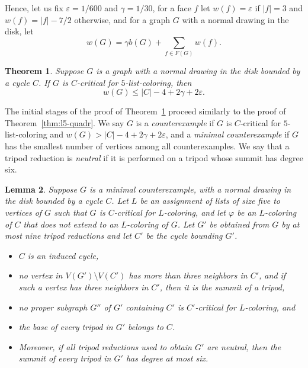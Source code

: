 \documentclass[12pt,twoside,openright,a4paper]{book}
\newtheorem{theorem}{Theorem}[chapter]
\newtheorem{lemma}[theorem]{Lemma}
\begin{document}
Hence, let us fix $\varepsilon=1/600$ and $\gamma=1/30$, for a face $f$ let $w(f)=\varepsilon$ if $|f|=3$ and $w(f)=|f|-7/2$ otherwise,
and for a graph $G$ with a normal drawing in the disk, let
$$w(G)=\gamma b(G)+\sum_{f\in F(G)} w(f).$$
\begin{theorem}\label{thm:l5-lin}
Suppose $G$ is a graph with a normal drawing in the disk bounded by a cycle $C$.
If $G$ is $C$-critical for $5$-list-coloring, then
$$w(G)\le |C|-4+2\gamma+2\varepsilon.$$
\end{theorem}
The initial stages of the proof of Theorem~\ref{thm:l5-lin} proceed similarly to the proof
of Theorem~\ref{thm:l5-quadr}.  We say $G$ is a \emph{counterexample} if $G$ is $C$-critical for $5$-list-coloring
and $w(G)>|C|-4+2\gamma+2\varepsilon$, and a \emph{minimal counterexample} if $G$ has the smallest number of vertices
among all counterexamples.  
We say that a tripod reduction is \emph{neutral} if it is performed on a tripod whose summit
has degree six.
\begin{lemma}\label{lemma:l5-lin-basic}
Suppose $G$ is a minimal counterexample, with a normal drawing in the disk bounded by a cycle $C$.
Let $L$ be an assignment of lists of size five to vertices of $G$ such that $G$ is $C$-critical for $L$-coloring,
and let $\varphi$ be an $L$-coloring of $C$ that does not extend to an $L$-coloring of $G$.
Let $G'$ be obtained from $G$ by at most nine tripod reductions and let $C'$ be the cycle bounding $G'$.
\begin{itemize}
\item $C$ is an induced cycle,
\item no vertex in $V(G')\setminus V(C')$ has more than three neighbors in $C'$, and if such a vertex
has three neighbors in $C'$, then it is the summit of a tripod, 
\item no proper subgraph $G''$ of $G'$ containing $C'$ is $C'$-critical for $L$-coloring, and
\item the base of every tripod in $G'$ belongs to $C$.
\item Moreover, if all tripod reductions used to obtain $G'$ are neutral, then the summit of every
tripod in $G'$ has degree at most six.
\end{itemize}
\end{lemma}
\end{document}

